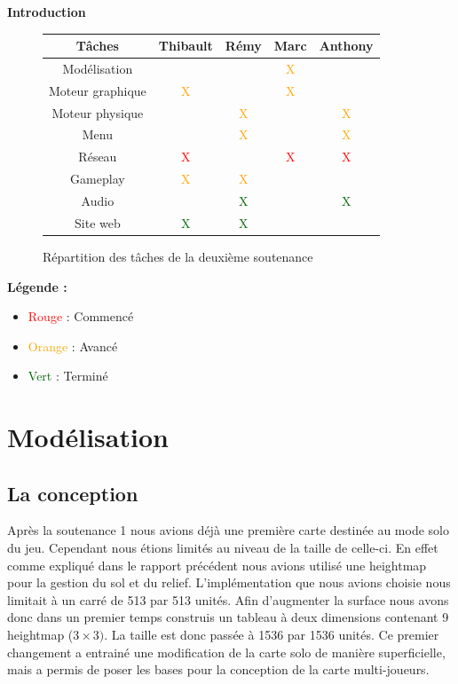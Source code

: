 \documentclass[11pt]{report}
\begin{document}
\tableofcontents

\newpage
\textbf{{\huge Introduction}} \vspace{7mm}

\begin{figure}[htbp]
\centering
\begin{tabular}{ | c || c | c | c | c | }
\hline Tâches & Thibault & Rémy & Marc & Anthony \\
\hline Modélisation & & & \textcolor{orange}{X} & \\
\hline Moteur graphique & \textcolor{orange}{X} & & \textcolor{orange}{X} & \\
\hline Moteur physique & & \textcolor{orange}{X} & & \textcolor{orange}{X} \\
\hline Menu & & \textcolor{orange}{X} & & \textcolor{orange}{X} \\
\hline Réseau & \textcolor{red}{X} & & \textcolor{red}{X} & \textcolor{red}{X} \\
\hline Gameplay & \textcolor{orange}{X} & \textcolor{orange}{X} & & \\
\hline Audio & & \textcolor{darkgreen}{X} & & \textcolor{darkgreen}{X} \\
\hline Site web & \textcolor{darkgreen}{X} & \textcolor{darkgreen}{X} & & \\
\hline
\end{tabular}
\caption{Répartition des tâches de la deuxième soutenance}
\end{figure}

\textbf{Légende :}
\begin{itemize}
  \item \textcolor{red}{Rouge} : Commencé
  \item \textcolor{orange}{Orange} : Avancé
  \item \textcolor{darkgreen}{Vert} : Terminé
\end{itemize}
\vspace*{7mm}

\newpage
\section{Modélisation}

\subsection{La conception}

Après la soutenance 1 nous avions déjà une première carte destinée au mode solo du jeu. Cependant nous étions limités au niveau de la taille de celle-ci. En effet comme expliqué dans le rapport précédent nous avions utilisé une heightmap pour la gestion du sol et du relief. L’implémentation que nous avions choisie nous limitait à un carré de 513 par 513 unités. Afin d’augmenter la surface nous avons donc dans un premier temps construis un tableau à deux dimensions contenant 9 heightmap (\(3 \times 3)\). La taille est donc passée à 1536 par 1536 unités. Ce premier changement a entrainé une modification de la carte solo de manière superficielle, mais a permis de poser les bases pour la conception de la carte multi-joueurs. 
\end{document}
